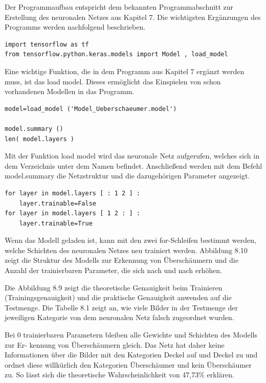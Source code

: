 Der Programmaufbau entspricht dem bekannten Programmabschnitt zur Erstellung des
neuronalen Netzes aus Kapitel 7. Die wichtigsten Ergänzungen des Programms werden
nachfolgend beschrieben.

\begin{lstlisting}
import tensorflow as tf
from tensorflow.python.keras.models import Model , load_model
\end{lstlisting}

Eine wichtige Funktion, die in dem Programm aus Kapitel 7 ergänzt werden muss, ist
das load model. Dieses ermöglicht das Einspielen von schon vorhandenen Modellen in das
Programm.

\begin{lstlisting}
model=load_model ('Model_Ueberschaeumer.model')

model.summary ()
len( model.layers )
\end{lstlisting}

Mit der Funktion load model wird das neuronale Netz aufgerufen, welches sich in dem 
Verzeichnis unter dem Namen befindet. Anschließend werden mit dem Befehl model.summary
die Netzstruktur und die dazugehörigen Parameter angezeigt.

\begin{lstlisting}
for layer in model.layers [ : 1 2 ] :
    layer.trainable=False
for layer in model.layers [ 1 2 : ] :
    layer.trainable=True
\end{lstlisting}

Wenn das Modell geladen ist, kann mit den zwei for-Schleifen bestimmt werden, welche
Schichten des neuronalen Netzes neu trainiert werden. Abbildung 8.10 zeigt die 
Struktur des Modells zur Erkennung von Überschäumern und die Anzahl der trainierbaren
Parameter, die sich nach und nach erhöhen.

Die Abbildung 8.9 zeigt die theoretische Genauigkeit beim Trainieren
(Trainingsgenauigkeit) und die praktische Genauigkeit anwenden auf die Testmenge.
Die Tabelle 8.1 zeigt an, wie viele Bilder in der Testmenge der jeweiligen Kategorie 
von dem neuronalen Netz falsch zugeordnet wurden.

Bei 0 trainierbaren Parametern bleiben alle Gewichte und Schichten des Modells zur Er-
kennung von Überschäumern gleich. Das Netz hat daher keine Informationen über die
Bilder mit den Kategorien Deckel auf und Deckel zu und ordnet diese willkürlich den
Kategorien Überschäumer und kein Überschäumer zu. So lässt sich die theoretische 
Wahrscheinlichkeit von 47,73\% erklären.

